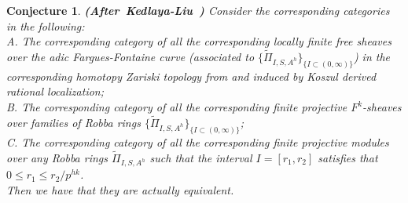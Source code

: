 \documentclass[12pt]{amsart}
\newtheorem{conjecture}[theorem]{Conjecture}
\theoremstyle{definition}
\numberwithin{equation}{section}
\begin{document}
\begin{conjecture}\mbox{\bf{(After Kedlaya-Liu \cite[Theorem 4.6.1]{KL2})}}
Consider the corresponding categories in the following:\\
A. The corresponding category of all the corresponding locally finite free sheaves over the adic Fargues-Fontaine curve (associated to $\{\widetilde{\Pi}_{I,S,A^h}\}_{\{I\subset (0,\infty)\}}$) in the corresponding homotopy Zariski topology from \cite{BK1} and \cite{BBBK} induced by Koszul derived rational localization;\\
B. The corresponding category of all the corresponding finite projective $F^k$-sheaves over families of Robba rings $\{\widetilde{\Pi}_{I,S,A^h}\}_{\{I\subset (0,\infty)\}}$;\\
C. The corresponding category of all the corresponding finite projective modules over any Robba rings $\widetilde{\Pi}_{I,S,A^h}$ such that the interval $I=[r_1,r_2]$ satisfies that $0\leq r_1 \leq r_2/p^{hk}$.\\
Then we have that they are actually equivalent.


\end{conjecture}
\end{document}
